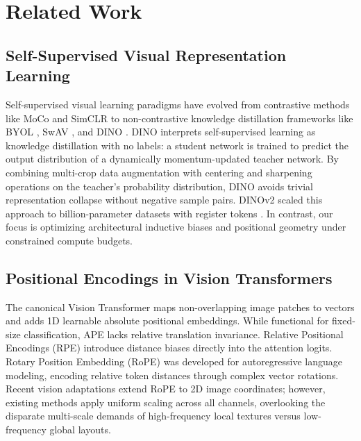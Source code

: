\documentclass[11pt,a4paper]{article}
\begin{document}
\section{Related Work}
\label{sec:related}

\subsection{Self-Supervised Visual Representation Learning}
Self-supervised visual learning paradigms have evolved from contrastive methods like MoCo \cite{he2020momentum, chen2021mocov3} and SimCLR to non-contrastive knowledge distillation frameworks like BYOL \cite{grill2020byol}, SwAV \cite{caron2020swav}, and DINO \cite{caron2021emerging}. DINO interprets self-supervised learning as knowledge distillation with no labels: a student network is trained to predict the output distribution of a dynamically momentum-updated teacher network. By combining multi-crop data augmentation with centering and sharpening operations on the teacher's probability distribution, DINO avoids trivial representation collapse without negative sample pairs. DINOv2 \cite{oquab2023dinov2} scaled this approach to billion-parameter datasets with register tokens \cite{darcet2024vision}. In contrast, our focus is optimizing architectural inductive biases and positional geometry under constrained compute budgets.

\subsection{Positional Encodings in Vision Transformers}
The canonical Vision Transformer \cite{dosovitskiy2020image} maps non-overlapping image patches to vectors and adds 1D learnable absolute positional embeddings. While functional for fixed-size classification, APE lacks relative translation invariance. Relative Positional Encodings (RPE) introduce distance biases directly into the attention logits. Rotary Position Embedding (RoPE) \cite{su2024roformer} was developed for autoregressive language modeling, encoding relative token distances through complex vector rotations. Recent vision adaptations extend RoPE to 2D image coordinates; however, existing methods apply uniform scaling across all channels, overlooking the disparate multi-scale demands of high-frequency local textures versus low-frequency global layouts.
\end{document}
